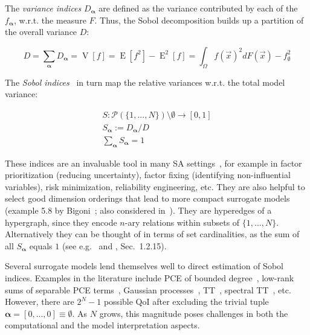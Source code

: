 \documentclass[review, twocolumn]{svjour3}          %
\begin{document}
The \emph{variance indices} $D_{\pmb{\alpha}}$ are defined as the variance contributed by each of the $f_{\pmb{\alpha}}$, w.r.t. the measure $F$. Thus, the Sobol decomposition builds up a partition of the overall variance $D$:

\begin{equation}
D = \sum_{\pmb{\alpha}} D_{\pmb{\alpha}} = \operatorname{V}[f] = \operatorname{E}[f^2] - \operatorname{E}^2[f] = \int_{\Omega} f(\vec{x})^2 dF(\vec{x}) - f_{\emptyset}^2
\end{equation}

The \emph{Sobol indices}~\cite{Sobol:90} in turn map the relative variances w.r.t. the total model variance:

\begin{equation}
\begin{array}{c}
S: \mathcal{P}(\{1, ..., N\}) \setminus \emptyset \to [0, 1] \\
S_{\pmb{\alpha}} := D_{\pmb{\alpha}}/D \\
\sum_{\pmb{\alpha}} S_{\pmb{\alpha}} = 1
\end{array}
\end{equation}

These indices are an invaluable tool in many SA settings~\cite{STCR:04}, for example in factor prioritization (reducing uncertainty), factor fixing (identifying non-influential variables), risk minimization, reliability engineering, etc. They are also helpful to select good dimension orderings that lead to more compact surrogate models (example 5.8 by Bigoni~\cite{Bigoni:14}; also considered in~\cite{DKLM:14}). They are hyperedges of a hypergraph, since they encode $n$-ary relations within subsets of $\{1, ..., N\}$. Alternatively they can be thought of in terms of set cardinalities, as the sum of all $S_{\pmb{\alpha}}$ equals $1$ (see e.g.~\cite{Owen:13} and \cite{SRACCGST:08}, Sec.~1.2.15).

Several surrogate models lend themselves well to direct estimation of Sobol indices. Examples in the literature include PCE of bounded degree~\cite{Sudret:08}, low-rank sums of separable PCE terms~\cite{KS:16}, Gaussian processes~\cite{MILR:09}, TT~\cite{DKLM:14}, spectral TT~\cite{BEM:16}, etc. However, there are $2^N - 1$ possible QoI after excluding the trivial tuple $\pmb{\alpha} = [0, ..., 0] \equiv \emptyset$. As $N$ grows, this magnitude poses challenges in both the computational and the model interpretation aspects.

\end{document}
